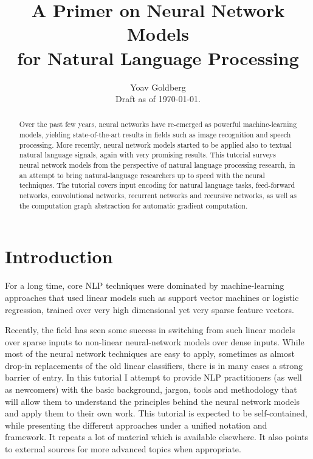 \documentclass[jair,twoside,11pt,theapa]{article}
\title{A Primer on Neural Network Models\\ for Natural Language Processing}
\author{Yoav Goldberg \\ \small{Draft as of \today.}}
\newcommand{\ygcomment}[1]{\textbf{[TODO: #1]}}
\renewcommand{\ygcomment}[1]{}
\begin{document}
\maketitle

\ygcomment{
data size: the compression work requires 2m sentences.
collobert and weston
    }


\vspace{1em}
\vspace{2em}

\begin{abstract}
    Over the past few years, neural networks have re-emerged as powerful
    machine-learning models, yielding state-of-the-art results in fields such as image
    recognition and speech processing. More recently, neural network models
    started to be applied also to textual natural language signals, again with very
    promising results.  This tutorial surveys neural network models from the
    perspective of natural language processing research, in an attempt to bring
    natural-language researchers up to speed with the neural techniques. The
    tutorial covers input encoding for natural language tasks, feed-forward
    networks, convolutional networks, recurrent networks and recursive networks,
    as well as the computation graph abstraction for
    automatic gradient computation.
\end{abstract}

\section{Introduction}
For a long time, core NLP techniques were dominated by machine-learning
approaches that used linear models such as support vector machines or logistic
regression, trained over very high dimensional yet very sparse feature vectors. 

Recently, the field has seen some success in switching from such linear models
over sparse inputs to non-linear neural-network models over dense inputs.  While
most of the neural network techniques are easy to apply, sometimes as almost
drop-in replacements of the old linear classifiers, there is in many cases a
strong barrier of entry.  In this tutorial I attempt to provide NLP
practitioners (as well as newcomers) with the basic background, jargon, tools
and methodology that will allow them to understand the principles behind the
neural network models and apply them to their own work.  This tutorial is
expected to be self-contained, while presenting the different approaches under a
unified notation and framework.  It repeats a lot of material which is available
elsewhere. It also points to external sources for more advanced topics when
appropriate.
\end{document}
